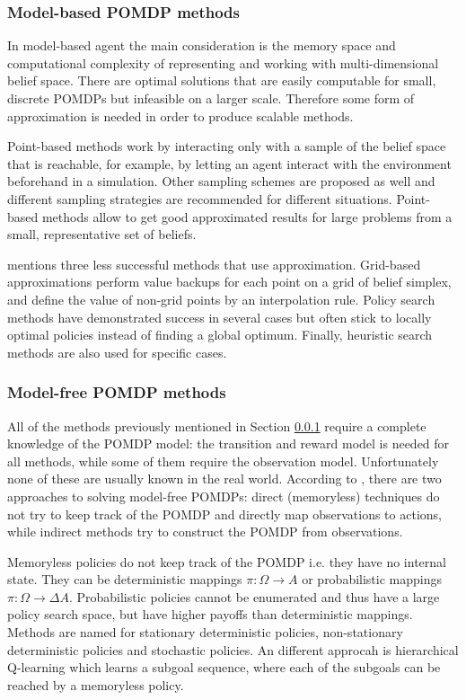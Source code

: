 \subsubsection{Model-based POMDP methods}
\label{sec:ai:model:based}

In model-based agent the main consideration is the memory space and
computational complexity of representing and working with multi-dimensional
belief space. There are optimal solutions that are easily computable for small,
discrete POMDPs but infeasible on a larger scale. Therefore some form of
approximation is needed in order to produce scalable methods.
\parencite{Spaan2012ai+pomdp}

Point-based methods work by interacting only with a sample of the belief space
that is reachable, for example, by letting an agent interact with the
environment beforehand in a simulation. Other sampling schemes are proposed as
well and different sampling strategies are recommended for different
situations. Point-based methods allow to get good approximated results for
large problems from a small, representative set of beliefs.
\parencite{Spaan2012ai+pomdp}

\textcite{Spaan2012ai+pomdp} mentions three less successful methods that use
approximation. Grid-based approximations perform value backups for each point
on a grid of belief simplex, and define the value of non-grid points by an
interpolation rule. Policy search methods have demonstrated success in several
cases but often stick to locally optimal policies instead of finding a global
optimum. Finally, heuristic search methods are also used for specific cases.


\subsubsection{Model-free POMDP methods}
\label{sec:ai:model:free}

All of the methods previously mentioned in Section \ref{sec:ai:model:based}
require a complete knowledge of the POMDP model: the transition and reward
model is needed for all methods, while some of them require the observation
model. Unfortunately none of these are usually known in the real world.
According to \textcite{Spaan2012ai+pomdp}, there are two approaches to solving
model-free POMDPs: direct (memoryless) techniques do not try to keep track of
the POMDP and directly map observations to actions, while indirect methods try
to construct the POMDP from observations.

Memoryless policies do not keep track of the POMDP i.e. they have no internal
state. They can be deterministic mappings \(\pi : \Omega \rightarrow A \) or
probabilistic mappings \(\pi : \Omega \rightarrow \Delta A \). Probabilistic
policies cannot be enumerated and thus have a large policy search space, but
have higher payoffs than deterministic mappings. Methods are named for
stationary deterministic policies, non-stationary deterministic policies and
stochastic policies. An different approcah is hierarchical Q-learning which
learns a subgoal sequence, where each of the subgoals can be reached by a
memoryless policy. \parencite{Spaan2012ai+pomdp}

